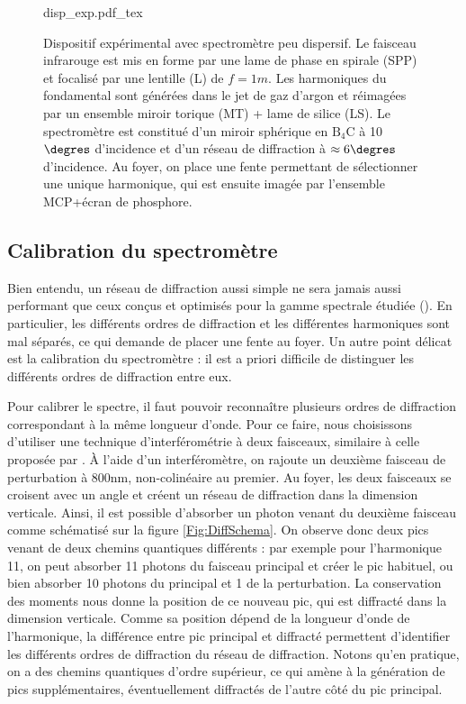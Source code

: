 \begin{figure}[!ht]
\centering
\def\svgwidth{\columnwidth}
{disp_exp.pdf_tex}
\caption{Dispositif expérimental avec spectromètre peu dispersif. Le faisceau infrarouge est mis en forme par une lame de phase en spirale (SPP) et focalisé par une lentille (L) de $f=1m$. Les harmoniques du fondamental sont générées dans le jet de gaz d'argon et réimagées par un ensemble miroir torique (MT) + lame de silice (LS). Le spectromètre est constitué d'un miroir sphérique en $\mathrm{B}_\mathrm{4}\mathrm{C}$ à 10$\degres$ d'incidence et d'un réseau de diffraction à $\approx 6\degres$ d'incidence. Au foyer, on place une fente permettant de sélectionner une unique harmonique, qui est ensuite imagée par l'ensemble MCP+écran de phosphore.}
\label{Fig:DispHartmut}
\end{figure}

\subsection{Calibration du spectromètre}
Bien entendu, un réseau de diffraction aussi simple ne sera jamais aussi performant que ceux conçus et optimisés pour la gamme spectrale étudiée (). En particulier, les différents ordres de diffraction et les différentes harmoniques sont mal séparés, ce qui demande de placer une fente au foyer. Un autre point délicat est la calibration du spectromètre : il est a priori difficile de distinguer les différents ordres de diffraction entre eux. 

Pour calibrer le spectre, il faut pouvoir reconnaître plusieurs ordres de diffraction correspondant à la même longueur d'onde. Pour ce faire, nous choisissons d'utiliser une technique d'interférométrie à deux faisceaux, similaire à celle proposée par . \`{A} l'aide d'un interféromètre, on rajoute un deuxième faisceau de perturbation à 800nm, non-colinéaire au premier. Au foyer, les deux faisceaux se croisent avec un angle et créent un réseau de diffraction dans la dimension verticale. Ainsi, il est possible d'absorber un photon venant du deuxième faisceau comme schématisé sur la figure \ref{Fig:DiffSchema}. On observe donc deux pics venant de deux chemins quantiques différents : par exemple pour l'harmonique 11, on peut absorber 11 photons du faisceau principal et créer le pic habituel, ou bien absorber 10 photons du principal et 1 de la perturbation. La conservation des moments nous donne la position de ce nouveau pic, qui est diffracté dans la dimension verticale. Comme sa position dépend de la longueur d'onde de l'harmonique, la différence entre pic principal et diffracté permettent d'identifier 
les différents ordres de diffraction du réseau de diffraction. Notons qu'en pratique, on a des chemins quantiques d'ordre supérieur, ce qui amène à la génération de pics supplémentaires, éventuellement diffractés de l'autre côté du pic principal.

